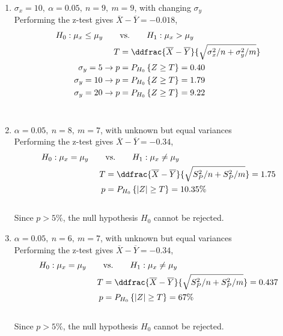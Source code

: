 \begin{enumerate}
	\item $ \sigma_x = 10,\ \alpha = 0.05,\ n = 9,\ m = 9$, with changing $ \sigma_y $\\
	Performing the z-test gives $ \overline{X} - \overline{Y} = -0.018 $,\\
	
	\begin{align}
		H_0 : \mu_x \leq \mu_y \qquad &\text{vs.} \qquad H_1 : \mu_x > \mu_y \nonumber \\
		T &= \ddfrac{ \overline{X} - \overline{Y} }{\sqrt{\sigma_x^2/n + \sigma_y^2/m}} \nonumber \\
		\sigma_y = 5 \to p &= P_{H_0}\left\{Z \geq T\right\} = 0.40 \nonumber \\ 
		\sigma_y = 10 \to p &= P_{H_0}\left\{Z \geq T\right\} = 1.79 \nonumber \\
		\sigma_y = 20 \to p &= P_{H_0}\left\{Z \geq T\right\} = 9.22 
	\end{align}\\
	
	\item $\alpha = 0.05,\ n = 8,\ m = 7$, with unknown but equal variances\\
	Performing the z-test gives $ \overline{X} - \overline{Y} = -0.34 $,\\
	
	\begin{align}
		H_0 : \mu_x = \mu_y \qquad &\text{vs.} \qquad H_1 : \mu_x \neq \mu_y \nonumber \\
		T &= \ddfrac{ \overline{X} - \overline{Y} }{\sqrt{S_P^2/n + S_P^2/m}} = 1.75\nonumber \\
		p &= P_{H_0}\left\{|Z| \geq T\right\} = 10.35\% 
	\end{align}\\
	Since $ p > 5\% $, the null hypothesis $ H_0 $ cannot be rejected.\\
	
	\item $\alpha = 0.05,\ n = 6,\ m = 7$, with unknown but equal variances\\
	Performing the z-test gives $ \overline{X} - \overline{Y} = -0.34 $,\\
	
	\begin{align}
		H_0 : \mu_x = \mu_y \qquad &\text{vs.} \qquad H_1 : \mu_x \neq \mu_y \nonumber \\
		T &= \ddfrac{ \overline{X} - \overline{Y} }{\sqrt{S_P^2/n + S_P^2/m}} = 0.437\nonumber \\
		p &= P_{H_0}\left\{|Z| \geq T\right\} = 67\% 
	\end{align}\\
	Since $ p > 5\% $, the null hypothesis $ H_0 $ cannot be rejected.\\
	

\end{enumerate}

